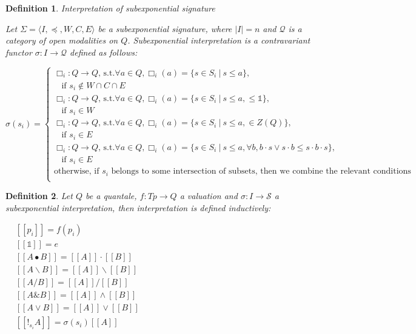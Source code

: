\documentclass[a4paper]{article}
\newtheorem{defin}{Definition}
\begin{document}
\begin{defin} Interpretation of subexponential signature

  Let $\Sigma = \langle I, \preceq, W, C, E \rangle$ be a subexponential signature, where $|I| = n$ and
  $\mathcal{Q}$ is a category of open modalities on $Q$.
  Subexponential interpretation is a contravariant functor $\sigma : I \to \mathcal{Q}$ defined as follows:

  $\sigma(s_i) = \begin{cases}
  \Box_i : Q \to Q \text{, s.t.} \forall a \in Q, \Box_i(a) = \{ s \in S_i \: | \: s \leq a\},
  \\ \:\:\:\: \text{if $s_i \notin W \cap C \cap E$} \\
  \Box_i : Q \to Q \text{, s.t.} \forall a \in Q, \Box_i(a) = \{ s \in S_i \: | \: s \leq a, \leq \mathds{1}\},
  \\ \:\:\:\: \text{if $s_i \in W$} \\
  \Box_i : Q \to Q \text{, s.t.} \forall a \in Q, \Box_i(a) = \{ s \in S_i \: | \: s \leq a, \in Z(Q) \},
  \\ \:\:\:\: \text{if $s_i \in E$} \\
  \Box_i : Q \to Q \text{, s.t.} \forall a \in Q, \Box_i(a) = \{ s \in S_i \: | \: s \leq a, \forall b, b \cdot s \vee s \cdot b \leq s \cdot b \cdot s \},
  \\ \:\:\:\: \text{if $s_i \in E$} \\
  \text{otherwise, if $s_i$ belongs to some intersection of subsets, then we combine the relevant conditions } \\
  \end{cases}$
\end{defin}

\begin{defin} Let $Q$ be a quantale, $f : Tp \to Q$ a valuation and $\sigma : I \to \mathcal{S}$ a subexponential interpretation, then
  interpretation is defined inductively:

\begin{center}
$\begin{array}{lll}
& [\![p_i]\!] = f(p_i)&\\
& [\![\mathds{1}]\!] = e & \\
&[\![A \bullet B]\!] = [\![A]\!] \cdot [\![B]\!] & \\
&[\![A \backslash B]\!] = [\![A]\!] \backslash [\![B]\!] & \\
&[\![A / B]\!] = [\![A]\!] / [\![B]\!]& \\
&[\![A \& B]\!] = [\![A]\!] \wedge [\![B]\!]& \\
&[\![A \vee B]\!] = [\![A]\!] \vee [\![B]\!]& \\
&[\![!_{s_i} A]\!] = \sigma(s_i) [\![A]\!]&
\end{array}$
\end{center}
\end{defin}
\end{document}
